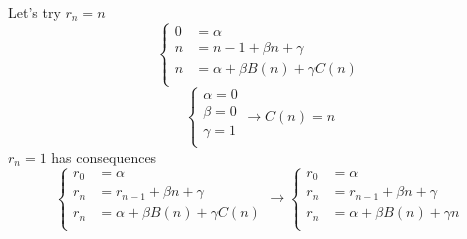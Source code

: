 \documentclass[mode=geye]{elegantnote}
\begin{document}
Let's try $ r_n = n $ 
\begin{equation*}
    \left\{
        \begin{array}{ll}
            0 &= \alpha\\
            n &= n-1+\beta n+\gamma\\
            n &= \alpha + \beta B(n) + \gamma C(n)\\
        \end{array}
    \right.
\end{equation*}
\begin{equation*}
    \left\{
        \begin{array}{l}
            \alpha = 0\\
            \beta = 0\\
            \gamma = 1\\
        \end{array}
    \right.
    \rightarrow C(n) = n
\end{equation*}
$ r_n=1 $ has consequences
\begin{equation*}
    \left\{
        \begin{array}{ll}
            r_0 &= \alpha\\
            r_n &= r_{n-1}+\beta n+\gamma\\
            r_n &= \alpha + \beta B(n) + \gamma C(n)\\
        \end{array}
    \right.
    \rightarrow
    \left\{
        \begin{array}{ll}
            r_0 &= \alpha\\
            r_n &= r_{n-1}+\beta n+\gamma\\
            r_n &= \alpha + \beta B(n) + \gamma n\\
        \end{array}
    \right.
\end{equation*}
\end{document}
